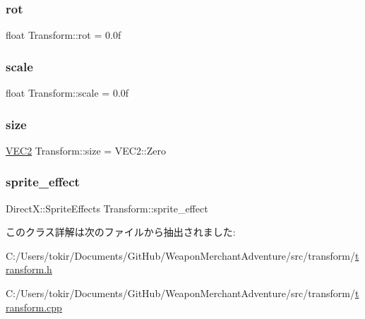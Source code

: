 \subsubsection{\texorpdfstring{rot}{rot}}
{\footnotesize\ttfamily float Transform\+::rot = 0.\+0f}

\mbox{\label{class_transform_a631712eb230305f58d164086d492701b}} 
\subsubsection{\texorpdfstring{scale}{scale}}
{\footnotesize\ttfamily float Transform\+::scale = 0.\+0f}

\mbox{\label{class_transform_a83e0bdbf8a2b4a45197d17d7415a6874}} 
\subsubsection{\texorpdfstring{size}{size}}
{\footnotesize\ttfamily \mbox{\hyperlink{common_8h_afb0c5e21d4133ff4f200992c0b534e1b}{V\+E\+C2}} Transform\+::size = V\+E\+C2\+::\+Zero}

\mbox{\label{class_transform_aef779df24fb3283f179950f9594b9fd4}} 
\subsubsection{\texorpdfstring{sprite\+\_\+effect}{sprite\_effect}}
{\footnotesize\ttfamily Direct\+X\+::\+Sprite\+Effects Transform\+::sprite\+\_\+effect}



このクラス詳解は次のファイルから抽出されました\+:\begin{DoxyCompactItemize}
\item 
C\+:/\+Users/tokir/\+Documents/\+Git\+Hub/\+Weapon\+Merchant\+Adventure/src/transform/\mbox{\hyperlink{transform_8h}{transform.\+h}}\item 
C\+:/\+Users/tokir/\+Documents/\+Git\+Hub/\+Weapon\+Merchant\+Adventure/src/transform/\mbox{\hyperlink{transform_8cpp}{transform.\+cpp}}\end{DoxyCompactItemize}
